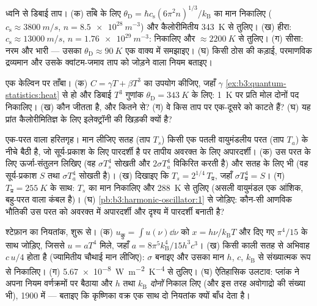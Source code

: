 \begin{exercise}[$\star\star$]\label{exo:b3:photons-phonons:7}
ध्वनि से डिबाई ताप। (क) ताँबे के लिए $\theta_{\text{D}} =
\hbar c_{\text{s}}(6\pi^2n)^{1/3}/k_{\text{B}}$ का मान निकालिए
($c_{\text{s}} \approx \qty{3800}{m/s}$, $n =
\qty{8.5e28}{m^{-3}}$) और कैलोरीमितीय
\qty{343}{K} से तुलिए। (ख) हीरा: $c_{\text{s}} \approx
\qty{13000}{m/s}$, $n = \qty{1.76e29}{m^{-3}}$: निकालिए और
$\approx\qty{2200}{K}$ से तुलिए। (ग) सीसा: नरम और भारी ---
उसका $\theta_{\text{D}} \approx \qty{90}{K}$ एक वाक्य में
समझाइए। (घ) किसी ठोस की कड़ाई, परमाणविक द्रव्यमान और उसके
क्वांटम-जमाव ताप को जोड़ने वाला नियम बताइए।
\end{exercise}

\begin{exercise}[$\star\star$]\label{exo:b3:photons-phonons:8}
एक केल्विन पर ताँबा। (क) $C = \gamma T + \beta T^3$ का उपयोग
कीजिए, जहाँ $\gamma$ \cref{ex:b3:quantum-statistics:heat} से हो और
डिबाई $T^3$ गुणांक $\theta_{\text{D}} = \qty{343}{K}$ के लिए:
\qty{1}{K} पर प्रति मोल दोनों पद निकालिए। (ख) कौन जीतता है, और
कितने से? (ग) वे किस ताप पर एक-दूसरे को काटते हैं? (घ) यह प्रांत
कैलोरीमितिज्ञ के लिए इलेक्ट्रॉनी  की खिड़की
क्यों है?
\end{exercise}

\begin{exercise}[$\star\star$]\label{exo:b3:photons-phonons:9}
एक-परत वाला हरितगृह। मान लीजिए सतह (ताप $T_s$) किसी एक पतली
वायुमंडलीय परत (ताप $T_a$) के नीचे बैठी है, जो सूर्य-प्रकाश के लिए
पारदर्शी है पर तापीय अवरक्त के लिए अपारदर्शी। (क) उस परत के लिए
ऊर्जा-संतुलन लिखिए (वह $\sigma T_s^4$ सोखती और
$2\sigma T_a^4$ विकिरित करती है) और सतह के लिए भी (वह सूर्य-प्रकाश
$S$ तथा $\sigma T_a^4$ सोखती है)। (ख) दिखाइए कि $T_s = 2^{1/4}\,T_{\text{प्र}}$,
जहाँ $\sigma T_{\text{प्र}}^4 = S$। (ग) $T_{\text{प्र}} =
\qty{255}{K}$ के साथ: $T_s$ का मान निकालिए और \qty{288}{K} से
तुलिए (असली वायुमंडल एक आंशिक, बहु-परत वाला कंबल है)। (घ)
\cref{pb:b3:harmonic-oscillator:1} से जोड़िए: कौन-सी आणविक भौतिकी
उस परत को अवरक्त में अपारदर्शी और दृश्य में पारदर्शी बनाती है?
\end{exercise}

\begin{exercise}[$\star\star\star$]\label{exo:b3:photons-phonons:10}
श्टेफ़ान का नियतांक, शुरू से। (क) $u_{\text{कु}} =
\int u(\nu)\dd\nu$ को $x = h\nu/k_{\text{B}}T$ और दिए गए
$\pi^4/15$ के साथ जोड़िए, जिससे $u = aT^4$ मिले, जहाँ $a =
8\pi^5k_{\text{B}}^4/15h^3c^3$। (ख) किसी काली
सतह से अभिवाह $c\,u/4$ होता है (ज्यामितीय चौथाई मान लीजिए):
$\sigma$ बनाइए और उसका मान $h$, $c$,
$k_{\text{B}}$ से संख्यात्मक रूप से निकालिए। (ग) \qty{5.67e-8}{W.m^{-2}.K^{-4}} से तुलिए।
(घ) ऐतिहासिक उलटाव: प्लांक ने अपना नियम वर्णक्रमों पर बैठाया और
$h$ तथा $k_{\text{B}}$ \emph{दोनों} निकाल लिए (और इस तरह अवोगाद्रो
की संख्या भी), 1900 में --- बताइए कि कृष्णिका वक्र एक साथ दो
नियतांक क्यों बाँध देता है।
\end{exercise}

